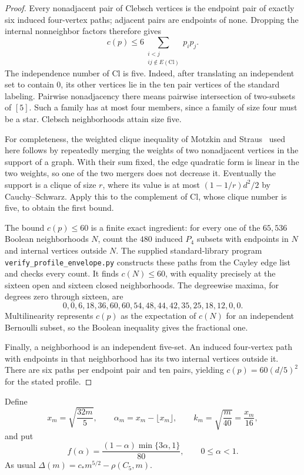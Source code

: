 \begin{proof}
Every nonadjacent pair of Clebsch vertices is the endpoint pair of exactly
six induced four-vertex paths; adjacent pairs are endpoints of none.
Dropping the internal nonneighbor factors therefore gives
\[
 c(p)\leq6\sum_{\substack{i<j\\ij\notin E(\mathrm{Cl})}}p_i p_j.
\]
The independence number of $\mathrm{Cl}$ is five. Indeed, after translating
an independent set to contain $0$, its other vertices lie in the ten pair
vertices of the standard labeling. Pairwise nonadjacency there means
pairwise intersection of two-subsets of $[5]$. Such a family has at most
four members, since a family of size four must be a star. Clebsch
neighborhoods attain size five.

For completeness, the weighted clique inequality of Motzkin and
Straus~\cite{MotzkinStraus1965} used here follows by repeatedly merging the
weights of two nonadjacent vertices in the support of a graph. With their
sum fixed, the edge quadratic form is linear in the two weights, so one
of the two mergers does not decrease it. Eventually the support is a
clique of size $r$, where its value is at most $(1-1/r)d^2/2$ by
Cauchy--Schwarz. Apply this to the complement of $\mathrm{Cl}$, whose
clique number is five, to obtain the first bound.

The bound $c(p)\leq60$ is a finite exact ingredient: for every one of the
$65,536$ Boolean neighborhoods $N$, count the $480$ induced $P_4$ subsets
with endpoints in $N$ and internal vertices outside $N$. The supplied
standard-library program \texttt{verify\_profile\_envelope.py} constructs
these paths from the Cayley edge list and checks every count. It finds
$c(N)\leq60$, with equality precisely at the sixteen open and sixteen
closed neighborhoods. The degreewise maxima, for degrees zero through
sixteen, are
\[
 0,0,6,18,36,60,60,54,48,44,42,35,25,18,12,0,0.
\]
Multilinearity represents $c(p)$ as the expectation of $c(N)$ for an
independent Bernoulli subset, so the Boolean inequality gives the
fractional one.

Finally, a neighborhood is an independent five-set. An induced
four-vertex path with endpoints in that neighborhood has its two internal
vertices outside it. There are six paths per endpoint pair and ten pairs,
yielding $c(p)=60(d/5)^2$ for the stated profile.
\end{proof}

Define
\[
 x_m=\sqrt{\frac{32m}{5}},\qquad
 \alpha_m=x_m-\lfloor x_m\rfloor,\qquad
 k_m=\sqrt{\frac{m}{40}}=\frac{x_m}{16},
\]
and put
\[
 f(\alpha)=\frac{(1-\alpha)\min\{3\alpha,1\}}{80},
 \qquad 0\leq\alpha<1.
\]
As usual $\Delta(m)=c_\ast m^{5/2}-\rho(C_5,m)$.

